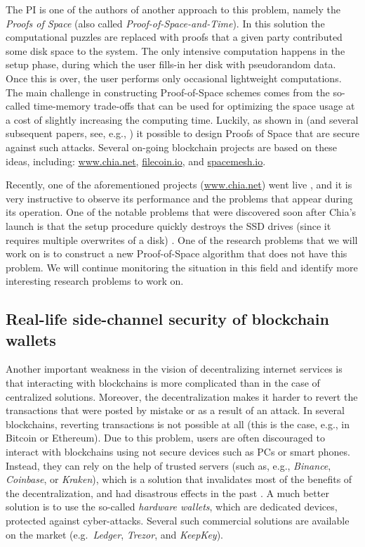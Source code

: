 \documentclass{article}
\begin{document}
The PI is one of the authors of another approach to this problem, namely the \emph{Proofs of Space} \cite{Dziembowski2015} (also called \emph{Proof-of-Space-and-Time}). In this solution the computational puzzles are replaced with proofs that a given party contributed some disk space to the system. The only intensive computation happens in the setup phase, during which the user fills-in her disk with pseudorandom data. Once this is over, the user performs only occasional lightweight computations. The main challenge in constructing Proof-of-Space schemes comes from the so-called time-memory trade-offs that can be used for optimizing the space usage at a cost of slightly increasing the computing time. Luckily, as shown in \cite{Dziembowski2015} (and several subsequent papers, see, e.g., \cite{Ren2016,Pietrzak2019,Moran2019,Abusalah2017}) it possible to design Proofs of Space that are secure against such attacks. Several on-going blockchain projects are based on these ideas, including: \url{www.chia.net}, \url{filecoin.io}, and \url{spacemesh.io}. 

Recently, one of the aforementioned projects (\url{www.chia.net}) went live \cite{Hern}, and it is very instructive to observe its performance and the problems that appear during its operation. One of the notable problems that were discovered soon after Chia's launch is that the setup procedure quickly destroys the SSD drives (since it requires multiple overwrites of a disk) \cite{Hern}. One of the research problems that we will work on is to construct a new Proof-of-Space algorithm that does not have this problem. We will continue monitoring the situation in this field and identify more interesting research problems to work on.




\subsection{Real-life side-channel security of blockchain wallets}\label{sec:side-channel}


Another important weakness in the vision of decentralizing internet services is that interacting with blockchains is more complicated than in the case of centralized solutions. Moreover, the decentralization makes it harder to revert the transactions that were posted by mistake or as a result of an attack. In several blockchains, reverting transactions is not possible at all (this is the case, e.g., in Bitcoin or Ethereum). Due to this problem, users are often discouraged to interact with block\-chains using not secure devices such as PCs or smart phones. Instead, they can rely on the help of trusted servers (such as, e.g., \emph{Binance}, \emph{Coinbase}, or \emph{Kraken}), which is a solution that invalidates most of the benefits of the decentralization, and had disastrous effects in the past \cite{McMillan}. A much better solution is to use the so-called \emph{hardware wallets}, which are dedicated devices, protected against cyber-attacks. Several such commercial solutions are available on the market (e.g.~\emph{Ledger}, \emph{Trezor}, and \emph{KeepKey}). 
\end{document}
